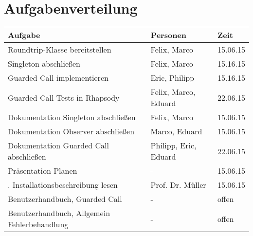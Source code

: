 \documentclass[a4paper]{article}
\begin{document}
\section*{Aufgabenverteilung}
\begin{tabular}{|l|l|l|}\hline
   \textbf{Aufgabe} & \textbf{Personen} & \textbf{Zeit} \\ \hline \hline
   Roundtrip-Klasse bereitstellen & Felix, Marco & 15.06.15 \\ \hline
   Singleton abschließen & Felix, Marco & 15.16.15 \\ \hline
   Guarded Call implementieren & Eric, Philipp & 15.16.15 \\ \hline
   Guarded Call Tests in Rhapsody & Felix, Marco, Eduard & 22.06.15 \\ \hline
   Dokumentation Singleton abschließen & Felix, Marco & 15.06.15 \\ \hline
   Dokumentation Observer abschließen & Marco, Eduard & 15.06.15 \\ \hline
   Dokumentation Guarded Call abschließen & Philipp, Eric, Eduard & 22.06.15 \\ \hline
   Präsentation Planen & - &  15.06.15 \\ \hline.
   Installationsbeschreibung lesen & Prof. Dr. Müller  & 15.06.15 \\ \hline
   Benutzerhandbuch, Guarded Call & - & offen \\ \hline
   Benutzerhandbuch, Allgemein Fehlerbehandlung & - & offen \\ \hline
 \end{tabular}
\end{document}
